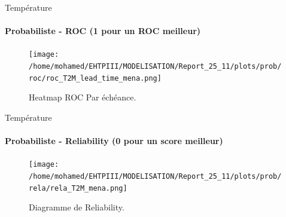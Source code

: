 \begin{frame}{Température}
\framesubtitle{Probabiliste - ROC (1 pour un ROC meilleur)}

\begin{figure}
    \centering
    \texttt{[image: /home/mohamed/EHTPIII/MODELISATION/Report\_25\_11/plots/prob/roc/roc\_T2M\_lead\_time\_mena.png]}
    \caption{Heatmap ROC  Par échéance.}
    \label{fig:enter-label}
\end{figure}
\end{frame}

\begin{frame}{Température}
\framesubtitle{Probabiliste - Reliability (0 pour un score meilleur)}

\begin{figure}
    \centering
    \texttt{[image: /home/mohamed/EHTPIII/MODELISATION/Report\_25\_11/plots/prob/rela/rela\_T2M\_mena.png]}
    \caption{Diagramme de Reliability.}
    \label{fig:enter-label}
\end{figure}
\end{frame}